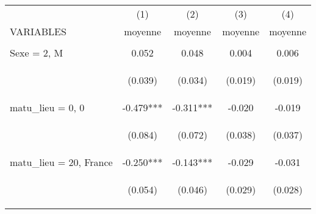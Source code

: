 \begin{center}
\begin{tabular}{lcccc} \hline
 & (1) & (2) & (3) & (4) \\
VARIABLES & moyenne & moyenne & moyenne & moyenne \\ \hline
\vspace{4pt} & \begin{footnotesize}\end{footnotesize} & \begin{footnotesize}\end{footnotesize} & \begin{footnotesize}\end{footnotesize} & \begin{footnotesize}\end{footnotesize} \\
Sexe = 2, M & 0.052 & 0.048 & 0.004 & 0.006 \\
\vspace{4pt} & \begin{footnotesize}(0.039)\end{footnotesize} & \begin{footnotesize}(0.034)\end{footnotesize} & \begin{footnotesize}(0.019)\end{footnotesize} & \begin{footnotesize}(0.019)\end{footnotesize} \\
matu\_lieu = 0, 0 & -0.479*** & -0.311*** & -0.020 & -0.019 \\
\vspace{4pt} & \begin{footnotesize}(0.084)\end{footnotesize} & \begin{footnotesize}(0.072)\end{footnotesize} & \begin{footnotesize}(0.038)\end{footnotesize} & \begin{footnotesize}(0.037)\end{footnotesize} \\
matu\_lieu = 20, France & -0.250*** & -0.143*** & -0.029 & -0.031 \\
\vspace{4pt} & \begin{footnotesize}(0.054)\end{footnotesize} & \begin{footnotesize}(0.046)\end{footnotesize} & \begin{footnotesize}(0.029)\end{footnotesize} & \begin{footnotesize}(0.028)\end{footnotesize} \\

\end{tabular}
\end{center}

